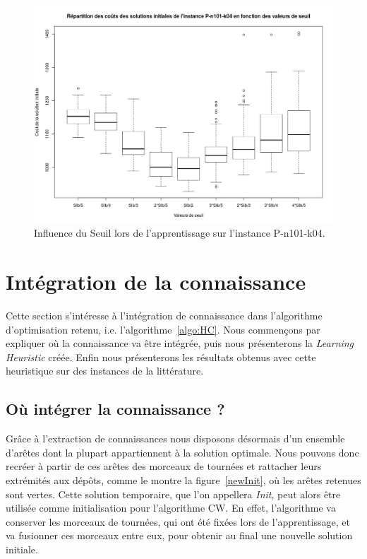 \documentclass[a4paper,11pt]{article}%
\begin{document}
\begin{figure}[p]
        \centering
        \includegraphics[scale=0.32]{InfluenceSeuilP10104}
        
        \caption{Influence du Seuil lors de l'apprentissage sur l'instance P-n101-k04.}
        \label{InfSP10104}
 
\end{figure}




\section{Intégration de la connaissance} 
\label{Integration}
Cette section s'intéresse à l'intégration de connaissance dans l'algorithme d'optimisation retenu, i.e. l'algorithme~\ref{algo:HC}. 
Nous commençons par expliquer où la connaissance va être intégrée, puis nous présenterons la \emph{Learning Heuristic} créée. Enfin nous présenterons les résultats obtenus avec cette heuristique sur des instances de la littérature.

\subsection{Où intégrer la connaissance ?}
Grâce à l'extraction de connaissances nous disposons désormais d'un ensemble d'arêtes dont la plupart appartiennent à la solution optimale. 
Nous pouvons donc recréer à partir de ces arêtes des morceaux de tournées et rattacher leurs extrémités aux dépôts, comme le montre la figure~\ref{newInit}, où les arêtes retenues sont vertes.
Cette solution temporaire, que l'on appellera \emph{Init}, peut alors être utilisée comme initialisation pour l'algorithme CW.
En effet, l'algorithme va conserver les morceaux de tournées, qui ont été fixées lors de l'apprentissage, et va fusionner ces morceaux entre eux, pour obtenir au final une nouvelle solution initiale.
\end{document}
